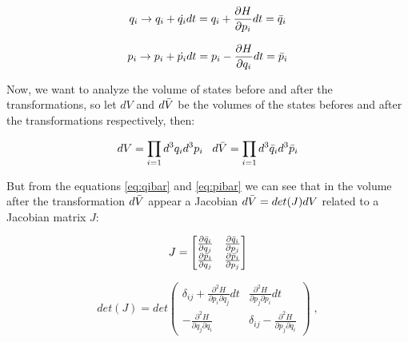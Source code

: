 \documentclass[spanish,notitlepage,letterpaper,11pt]{article} %
\numberwithin{equation}{subsection}
\begin{document}
        \begin{equation}\label{eq:qibar}
            q_i \rightarrow q_i + \Dot{q_i}dt = q_i + \frac{\partial H}{\partial p_i}dt = \Bar{q}_i
        \end{equation}

        \begin{equation}\label{eq:pibar}
            p_i \rightarrow p_i + \Dot{p_i}dt = p_i - \frac{\partial H}{\partial q_i}dt = \Bar{p}_i
        \end{equation}

        Now, we want to analyze the volume of states before and after the transformations, so let $dV$ and $d\Bar{V}$ be the volumes of the states befores and after the transformations respectively, then:

        \begin{equation*}
            dV = \prod_{i=1}d^3q_id^3p_i \;\;\; d\Bar{V} = \prod_{i=1}d^3\Bar{q}_id^3\Bar{p}_i
        \end{equation*}

        But from the equations \ref{eq:qibar} and \ref{eq:pibar} we can see that in the volume after the transformation $d\Bar{V}$ appear a Jacobian $d\Bar{V} = det(J)dV$ related to a Jacobian matrix $J$:

        \begin{equation*}
            J = \begin{bmatrix}
                \frac{\partial \Bar{q}_i}{\partial q_j} & \frac{\partial \Bar{q}_i}{\partial p_j}\\

                \frac{\partial \Bar{p}_i}{\partial q_j} & \frac{\partial \Bar{p}_i}{\partial p_j}
            \end{bmatrix}
        \end{equation*}

        \begin{equation}
            det(J) =
            det 
            \begin{pmatrix}
                \delta_{ij} + \frac{\partial^2H}{\partial p_i \partial q_j}dt & \frac{\partial^2 H}{\partial p_j \partial p_i}dt \\

                - \frac{\partial^2 H}{\partial q_j \partial q_i} & \delta_{ij} - \frac{\partial^2 H}{\partial p_j \partial q_i}
            \end{pmatrix}\;,
        \end{equation}
\end{document}
